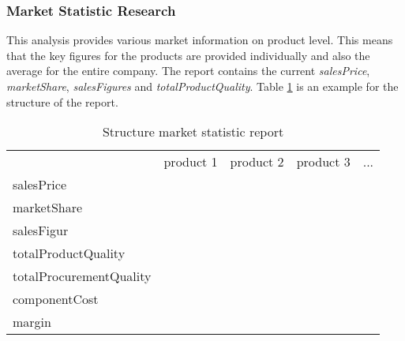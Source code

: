 \subsubsection{Market Statistic Research}
This analysis provides various market information on product level. This means that the key figures for the products are provided individually and also the average for the entire company. The report contains the current \textit{salesPrice}, \textit{marketShare}, \textit{salesFigures} and \textit{totalProductQuality}. Table \ref{MR_market_statistic} is an example for the structure of the report. \\

\begin{table}[ht]
\centering
\begin{tabular}{|l|r|r|r|r|}
\hline
                    & product 1   & product 2  & product 3 & ...       \\
salesPrice          &             &            &           &           \\
marketShare         &             &            &           &           \\
salesFigur          &             &            &           &           \\
totalProductQuality &             &            &           &           \\
totalProcurementQuality  &             &            &           &           \\
componentCost       &             &            &           &           \\
margin              &             &            &           &           \\
\hline
\end{tabular}
\caption{Structure market statistic report}
\label{MR_market_statistic}
\end{table}